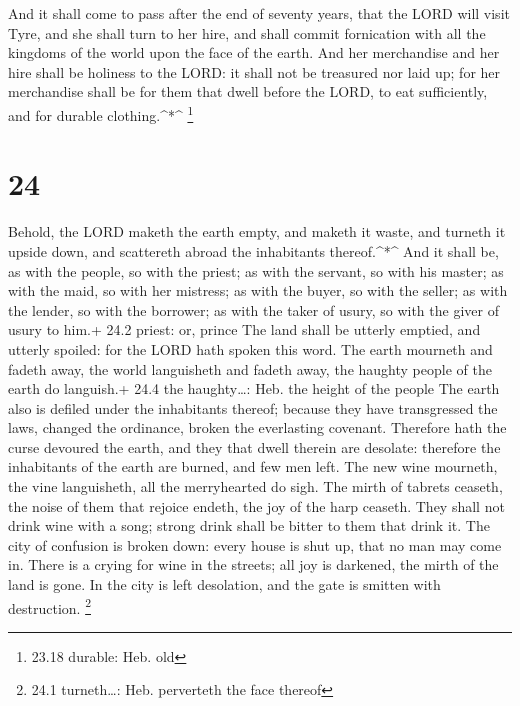  And it shall come to pass after the end of seventy years,
that the LORD will visit Tyre, and she shall turn to her hire, and shall
commit fornication with all the kingdoms of the world upon the face of
the earth.  And her merchandise and her hire shall be
holiness to the LORD: it shall not be treasured nor laid up; for her
merchandise shall be for them that dwell before the LORD, to eat
sufficiently, and for durable clothing.\^{}*\^{} \footnote{23.18
  durable: Heb. old}

\hypertarget{section-23}{%
\section{24}\label{section-23}}

 Behold, the LORD maketh the earth empty, and maketh it
waste, and turneth it upside down, and scattereth abroad the inhabitants
thereof.\^{}*\^{}  And it shall be, as with the people, so
with the priest; as with the servant, so with his master; as with the
maid, so with her mistress; as with the buyer, so with the seller; as
with the lender, so with the borrower; as with the taker of usury, so
with the giver of usury to him.+ 24.2 priest: or, prince 
The land shall be utterly emptied, and utterly spoiled: for the LORD
hath spoken this word.  The earth mourneth and fadeth away,
the world languisheth and fadeth away, the haughty people of the earth
do languish.+ 24.4 the haughty\ldots: Heb. the height of the people
 The earth also is defiled under the inhabitants thereof;
because they have transgressed the laws, changed the ordinance, broken
the everlasting covenant.  Therefore hath the curse devoured
the earth, and they that dwell therein are desolate: therefore the
inhabitants of the earth are burned, and few men left.  The
new wine mourneth, the vine languisheth, all the merryhearted do sigh.
 The mirth of tabrets ceaseth, the noise of them that
rejoice endeth, the joy of the harp ceaseth.  They shall not
drink wine with a song; strong drink shall be bitter to them that drink
it.  The city of confusion is broken down: every house is
shut up, that no man may come in.  There is a crying for
wine in the streets; all joy is darkened, the mirth of the land is gone.
 In the city is left desolation, and the gate is smitten
with destruction. \footnote{24.1 turneth\ldots: Heb. perverteth the face
  thereof}

